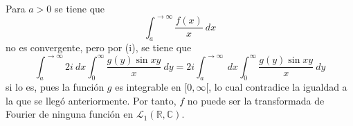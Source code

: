 \documentclass[12pt]{report}
\theoremstyle{largebreak}
\begin{document}
\begin{sol}
\begin{equation*}
\begin{split}
            \end{split}
        \end{equation*}
        Para $a>0$ se tiene que
        \begin{equation*}
            \int_{a}^{ \rightarrow\infty}\frac{f(x)}{x}\:dx
        \end{equation*}
        no es convergente, pero por (i), se tiene que
        \begin{equation*}
            \int_{a}^{\rightarrow\infty}2i\:dx \int_{0}^{\infty}\frac{g(y)\sin xy}{x}\:dy=2i\int_{a}^{\rightarrow\infty}\:dx\int_{0}^{\infty}\frac{g(y)\sin xy}{x}\:dy
        \end{equation*}
        si lo es, pues la función $g$ es integrable en $[0,\infty[$, lo cual contradice la igualdad a la que se llegó anteriormente. Por tanto, $f$ no puede ser la transformada de Fourier de ninguna función en $\mathcal{L}_1(\mathbb{R},\mathbb{C})$.
    \end{sol}
\end{document}
